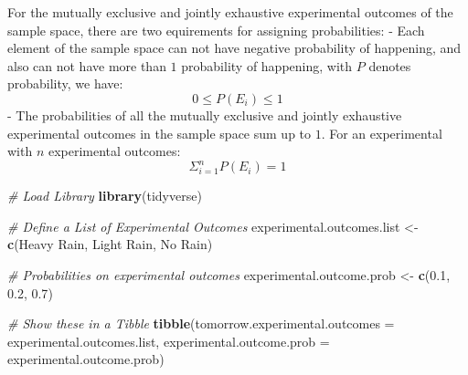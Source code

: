 \documentclass[
]{book}
\newenvironment{Shaded}{\begin{snugshade}}{\end{snugshade}}
\newcommand{\CommentTok}[1]{\textcolor[rgb]{0.56,0.35,0.01}{\textit{#1}}}
\newcommand{\DataTypeTok}[1]{\textcolor[rgb]{0.13,0.29,0.53}{#1}}
\newcommand{\FloatTok}[1]{\textcolor[rgb]{0.00,0.00,0.81}{#1}}
\newcommand{\KeywordTok}[1]{\textcolor[rgb]{0.13,0.29,0.53}{\textbf{#1}}}
\newcommand{\NormalTok}[1]{#1}
\newcommand{\StringTok}[1]{\textcolor[rgb]{0.31,0.60,0.02}{#1}}
\begin{document}
For the mutually exclusive and jointly exhaustive experimental outcomes of the sample space, there are two equirements for assigning probabilities:
- Each element of the sample space can not have negative probability of happening, and also can not have more than \(1\) probability of happening, with \(P\) denotes probability, we have:
\[0 \le P(E_i) \le 1\]
- The probabilities of all the mutually exclusive and jointly exhaustive experimental outcomes in the sample space sum up to \(1\). For an experimental with \(n\) experimental outcomes:
\[\Sigma_{i=1}^{n} P(E_i) = 1\]

\begin{Shaded}
\begin{Highlighting}[]
\CommentTok{\# Load Library}
\KeywordTok{library}\NormalTok{(tidyverse)}

\CommentTok{\# Define a List of Experimental Outcomes}
\NormalTok{experimental.outcomes.list \textless{}{-}}\StringTok{ }\KeywordTok{c}\NormalTok{(}\StringTok{\textquotesingle{}Heavy Rain\textquotesingle{}}\NormalTok{, }\StringTok{\textquotesingle{}Light Rain\textquotesingle{}}\NormalTok{, }\StringTok{\textquotesingle{}No Rain\textquotesingle{}}\NormalTok{)}

\CommentTok{\# Probabilities on experimental outcomes}
\NormalTok{experimental.outcome.prob \textless{}{-}}\StringTok{ }\KeywordTok{c}\NormalTok{(}\FloatTok{0.1}\NormalTok{, }\FloatTok{0.2}\NormalTok{, }\FloatTok{0.7}\NormalTok{)}

\CommentTok{\# Show these in a Tibble}
\KeywordTok{tibble}\NormalTok{(}\DataTypeTok{tomorrow.experimental.outcomes =}\NormalTok{ experimental.outcomes.list,}
       \DataTypeTok{experimental.outcome.prob =}\NormalTok{ experimental.outcome.prob)}
\end{Highlighting}
\end{Shaded}
\end{document}
